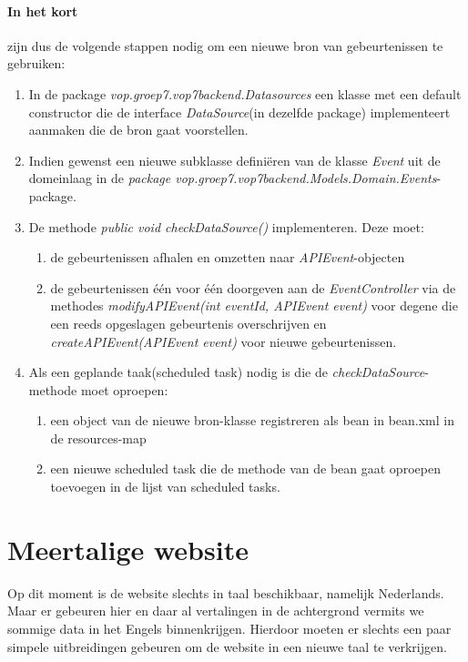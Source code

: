 \documentclass{article}
\newcommand*{\javaclass}[1]{\emph{#1}}
\newcommand*{\javaintfc}[1]{\javaclass{#1}}
\newcommand*{\javapckg}[1]{\javaclass{#1}}
\newcommand*{\javamethodpres}[1]{\javaclass{#1}}
\newcommand*{\javamethod}[2]{\javaclass{#1(#2)}}
\begin{document}
\paragraph{In het kort} zijn dus de volgende stappen nodig om een nieuwe bron van gebeurtenissen te gebruiken:
\begin{enumerate}
\item In de package \javapckg{vop.groep7.vop7backend.Datasources} een klasse met een default constructor die de interface \javaintfc{DataSource}(in dezelfde package) implementeert aanmaken die de bron gaat voorstellen.
\item Indien gewenst een nieuwe subklasse defini\"eren van de klasse \javaclass{Event} uit de domeinlaag in de \javapckg{package vop.groep7.vop7backend.Models.Domain.Events}-package.
\item De methode  \javamethod{public void checkDataSource}{} implementeren. Deze moet:
	\begin{enumerate}
		\item de gebeurtenissen afhalen en omzetten naar \javaclass{APIEvent}-objecten %
		\item de gebeurtenissen \'e\'en voor \'e\'en doorgeven aan de \javaclass{EventController} via de methodes \javamethod{modifyAPIEvent}{int eventId, APIEvent event} voor  degene die een reeds opgeslagen gebeurtenis overschrijven en \javamethod{createAPIEvent}{APIEvent event} voor nieuwe gebeurtenissen.
	\end{enumerate}
\item Als een geplande taak(scheduled task) nodig is die de \javamethodpres{checkDataSource}-methode moet oproepen:
	\begin{enumerate}
		\item een object van de nieuwe bron-klasse registreren als bean in bean.xml in de resources-map
		\item een nieuwe scheduled task die de methode van de bean gaat oproepen toevoegen in de lijst van scheduled tasks.
	\end{enumerate}
\end{enumerate}

\section{Meertalige website}
Op dit moment is de website slechts in  taal beschikbaar, namelijk Nederlands. Maar er gebeuren hier en daar al vertalingen in de achtergrond vermits we sommige data in het Engels binnenkrijgen. Hierdoor moeten er slechts een paar simpele uitbreidingen gebeuren om de website in een nieuwe taal te verkrijgen.
\end{document}
